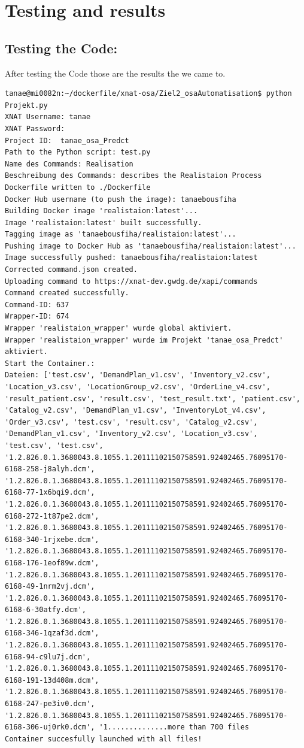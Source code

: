 \chapter{Testing and results}
\section{Testing the Code:}
After testing the Code those are the results the we came to. 
\begin{lstlisting}
tanae@mi0082n:~/dockerfile/xnat-osa/Ziel2_osaAutomatisation$ python Projekt.py
XNAT Username: tanae
XNAT Password:
Project ID:  tanae_osa_Predct
Path to the Python script: test.py
Name des Commands: Realisation
Beschreibung des Commands: describes the Realistaion Process
Dockerfile written to ./Dockerfile
Docker Hub username (to push the image): tanaebousfiha
Building Docker image 'realistaion:latest'...
Image 'realistaion:latest' built successfully.
Tagging image as 'tanaebousfiha/realistaion:latest'...
Pushing image to Docker Hub as 'tanaebousfiha/realistaion:latest'...
Image successfully pushed: tanaebousfiha/realistaion:latest
Corrected command.json created.
Uploading command to https://xnat-dev.gwdg.de/xapi/commands
Command created successfully.
Command-ID: 637
Wrapper-ID: 674
Wrapper 'realistaion_wrapper' wurde global aktiviert.
Wrapper 'realistaion_wrapper' wurde im Projekt 'tanae_osa_Predct' aktiviert.
Start the Container.:
Dateien: ['test.csv', 'DemandPlan_v1.csv', 'Inventory_v2.csv', 'Location_v3.csv', 'LocationGroup_v2.csv', 'OrderLine_v4.csv', 'result_patient.csv', 'result.csv', 'test_result.txt', 'patient.csv', 'Catalog_v2.csv', 'DemandPlan_v1.csv', 'InventoryLot_v4.csv', 'Order_v3.csv', 'test.csv', 'result.csv', 'Catalog_v2.csv', 'DemandPlan_v1.csv', 'Inventory_v2.csv', 'Location_v3.csv', 'test.csv', 'test.csv', '1.2.826.0.1.3680043.8.1055.1.20111102150758591.92402465.76095170-6168-258-j8alyh.dcm', '1.2.826.0.1.3680043.8.1055.1.20111102150758591.92402465.76095170-6168-77-1x6bqi9.dcm', '1.2.826.0.1.3680043.8.1055.1.20111102150758591.92402465.76095170-6168-272-1t87pe2.dcm', '1.2.826.0.1.3680043.8.1055.1.20111102150758591.92402465.76095170-6168-340-1rjxebe.dcm', '1.2.826.0.1.3680043.8.1055.1.20111102150758591.92402465.76095170-6168-176-1eof89w.dcm', '1.2.826.0.1.3680043.8.1055.1.20111102150758591.92402465.76095170-6168-49-1nrm2vj.dcm', '1.2.826.0.1.3680043.8.1055.1.20111102150758591.92402465.76095170-6168-6-30atfy.dcm', '1.2.826.0.1.3680043.8.1055.1.20111102150758591.92402465.76095170-6168-346-1qzaf3d.dcm', '1.2.826.0.1.3680043.8.1055.1.20111102150758591.92402465.76095170-6168-94-c9lu7j.dcm', '1.2.826.0.1.3680043.8.1055.1.20111102150758591.92402465.76095170-6168-191-13d408m.dcm', '1.2.826.0.1.3680043.8.1055.1.20111102150758591.92402465.76095170-6168-247-pe3iv0.dcm', '1.2.826.0.1.3680043.8.1055.1.20111102150758591.92402465.76095170-6168-306-uj0rk0.dcm', '1..............more than 700 files
Container succesfully launched with all files!
\end{lstlisting}
